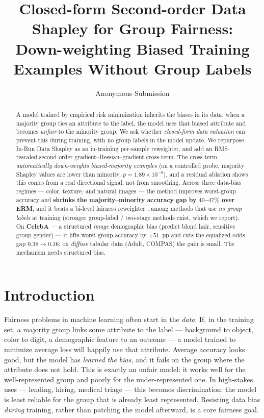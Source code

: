 \documentclass[letterpaper]{article}
\title{Closed-form Second-order Data Shapley for Group Fairness:\\
Down-weighting Biased Training Examples Without Group Labels}
\author{Anonymous Submission}
\begin{document}
\maketitle

\begin{abstract}
A model trained by empirical risk minimization inherits the biases in its data:
when a majority group ties an attribute to the label, the model uses that
biased attribute and becomes \emph{unfair} to the minority group. We ask whether
\emph{closed-form data valuation} can prevent this during training, with no group
labels in the model update. We repurpose In-Run Data Shapley \citep{wang2024inrun}
as an in-training per-sample reweighter, and add an RMS-rescaled second-order
gradient--Hessian--gradient cross-term. The cross-term \emph{automatically
down-weights biased-majority examples} (on a controlled probe, majority Shapley
values are lower than minority, $p=1.89\times10^{-8}$), and a residual ablation
shows this comes from a real directional signal, not from smoothing. Across three
data-bias regimes --- color, texture, and natural images --- the method improves
worst-group accuracy and \textbf{shrinks the majority--minority accuracy gap by
$40$--$47\%$ over ERM}, and it beats a bi-level fairness reweighter
\citep{ren2018reweight}, among methods that use \emph{no group labels} at training
(stronger group-label / two-stage methods exist, which we report). On \textbf{CelebA}
--- a structured \emph{image} demographic bias (predict blond hair, sensitive
group gender) --- it lifts worst-group accuracy by $+51$~pp and cuts the
equalized-odds gap $0.38{\to}0.16$; on \emph{diffuse} tabular data (Adult, COMPAS)
the gain is small. The mechanism needs structured bias.
\end{abstract}

\section{Introduction}

Fairness problems in machine learning often start in the \emph{data}. If, in the
training set, a majority group links some attribute to the label --- background to
object, color to digit, a demographic feature to an outcome --- a model trained to
minimize average loss will happily use that attribute. Average accuracy looks
good, but the model has \emph{learned the bias}, and it fails on the group where
the attribute does not hold. This is exactly an unfair model: it works well for
the well-represented group and poorly for the under-represented one. In high-stakes uses --- lending,
hiring, medical triage --- this becomes discrimination: the model is least
reliable for the group that is already least represented. Resisting data bias
\emph{during} training, rather than patching the model afterward, is a core
fairness goal.
\end{document}
